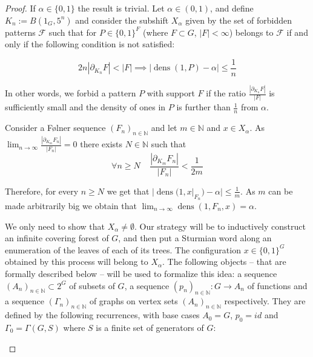 \documentclass[letterpaper]{article}
\theoremstyle{plain}
\def\NN{\mathbb{N}}
\def\FF{\mathcal{F}}
\def\dens{\operatorname{dens}}
\begin{document}
	\begin{proof}
		
		If $\alpha \in \{0,1\}$ the result is trivial. Let $\alpha \in (0,1)$, and define $K_n := B(1_G,5^n)$ and consider the subshift $X_{\alpha}$ given by the set of forbidden patterns $\FF$ such that for $P \in \{0,1\}^F$ (where $F \subset G$, $|F|<\infty$) belongs to $\FF$ if and only if the following condition is not satisfied:
		
		$$2n|\partial_{K_n}F| < |F| \implies |\dens(1,P)-\alpha| \leq \frac{1}{n}$$
		
		In other words, we forbid a pattern $P$ with support $F$ if the ratio $\frac{|\partial_{K_n}F|}{|F|}$ is sufficiently small and the density of ones in $P$ is further than $\frac{1}{n}$ from $\alpha$.
		
		Consider a F\o lner sequence $(F_n)_{n \in \NN}$ and let $m \in \NN$ and $x \in X_{\alpha}$. As $\lim_{n \to \infty}\frac{|\partial_{K_m}F_n|}{|F_n|} = 0$ there exists $N \in \NN$ such that $$\forall n \geq N \ \ \ \ \ \frac{|\partial_{K_m}F_n|}{|F_n|} < \frac{1}{2m}$$
		
		Therefore, for every $n \geq N$ we get that $|\dens(1,x|_{F_n})-\alpha| \leq \frac{1}{m}$. As $m$ can be made arbitrarily big we obtain that $\lim_{n \to \infty} \dens(1,F_n,x) = \alpha$.
		
		\bigskip
		
		We only need to show that $X_{\alpha} \neq \emptyset$. Our strategy will be to inductively construct an infinite covering forest of $G$, and then put a Sturmian word along an enumeration of the leaves of each of its trees. The configuration $x\in\{0,1\}^G$ obtained by this process will belong to $X_\alpha$. The following objects -- that are formally described below -- will be used to formalize this idea: a sequence $(A_n)_{n \in \NN} \subset 2^G$ of subsets of $G$, a sequence $(p_n)_{n \in \NN}: G \to A_n$ of functions and a sequence $(\Gamma_n)_{n \in \NN}$ of graphs on vertex sets $(A_n)_{n \in \NN}$ respectively. They are defined by the following recurrences, with base cases $A_0 = G$, $p_0 = id$ and $\Gamma_0 = \Gamma(G,S)$ where $S$ is a finite set of generators of $G$: 
		
		\label{inductive_structure_forest}
		

\end{proof}
\end{document}
